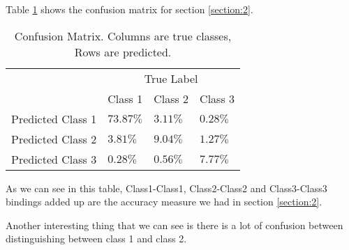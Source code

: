 \documentclass[12pt]{article}
\begin{document}
\noindent
Table \ref{table:3} shows the confusion matrix for section \ref{section:2}.

\begin{table}[h!]
    \centering
    \begin{tabular}{l|l|l|l|}
        &\multicolumn{3}{c}{True Label}\\
        &Class 1 & Class 2 & Class 3\\
        \hline
        Predicted Class 1 & $73.87\%$ & $3.11\%$ & $0.28\%$\\
        Predicted Class 2 & $3.81\%$ & $9.04\%$ & $1.27\%$ \\
        Predicted Class 3 & $0.28\%$ & $0.56\%$ & $7.77\%$ \\
        \hline
    \end{tabular}
    \caption{Confusion Matrix.  Columns are true classes, Rows are predicted.}
    \label{table:3}
\end{table}

\noindent
As we can see in this table, Class1-Class1, Class2-Class2 and Class3-Class3 bindings added up are the accuracy measure we had in section \ref{section:2}.

\noindent
Another interesting thing that we can see is there is a lot of confusion between distinguishing between class 1 and class 2.
\end{document}
